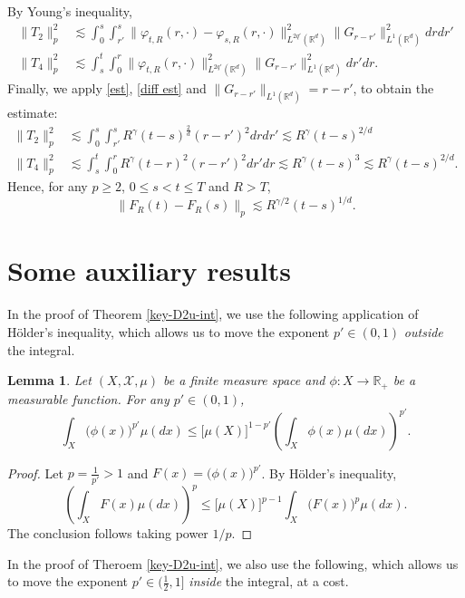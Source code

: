 \documentclass[12pt]{article}
\newtheorem{lemma}[theorem]{Lemma}
\def\bR{\mathbb{R}}
\newcommand{\les}{\lesssim}
\begin{document}
By Young's inequality, 
\begin{align*}
\|T_2\|^2_p & \les \int_0^s \int_{r'}^s  \| \varphi_{t,R}(r,\cdot) - \varphi_{s,R}(r,\cdot) \|_{L^{2q'}(\bR^d)}^2 \|G_{r-r'}\|_{L^1(\bR^d)}^2 drdr' \\
\|T_4\|^2_p & \les \int_s^t \int_0^r  \| \varphi_{t,R}(r,\cdot)\|_{L^{2q'}(\bR^d)}^2 \|G_{r-r'}\|_{L^1(\bR^d)}^2 dr'dr.
\end{align*}
Finally, we apply \eqref{est}, \eqref{diff est} and $\|G_{r-r'}\|_{L^1(\bR^d)} = r-r'$, to obtain the estimate:
\begin{align*}
\|T_2\|^2_p & \les \int_0^s \int_{r'}^s  R^{\gamma} (t-s)^{\frac{2}{d}} (r-r')^2 drdr' \les R^{\gamma}(t-s)^{2/d} \\
\|T_4\|^2_p & \les \int_s^t \int_0^r R^{\gamma} (t-r)^{2} (r-r')^2 dr'dr \les R^{\gamma}(t-s)^{3} \les R^{\gamma}(t-s)^{2/d}.
\end{align*}
Hence, for any $p\geq 2$, $0\leq s<t\leq T$ and $R>T$,
\[
\|F_R(t)-F_R(s)\|_p \les R^{\gamma/2} (t-s)^{1/d}.
\]


\appendix
\section{Some auxiliary results}

In the proof of Theorem \ref{key-D2u-int}, we use the following application of H\"older's inequality, which allows us to move the exponent $p' \in (0,1)$ {\em outside} the integral.


\begin{lemma}
\label{Hol-lem}
Let $(X,\mathcal{X},\mu)$ be a finite measure space and $\phi:X \to \bR_{+}$ be a measurable function. For any $p' \in (0,1)$,
\[
\int_{X} \big(\phi(x)\big)^{p'} \mu(dx) \leq \big[\mu(X)\big]^{1-p'} \left( \int_{X} \phi(x) \mu(dx)\right)^{p'}.
\]
\end{lemma}

\begin{proof}
Let $p=\frac{1}{p'}>1$ and $F(x)=\big(\phi(x)\big)^{p'}$. By H\"older's inequality,
\[
\left(\int_{X} F(x) \mu(dx)\right)^p \leq \big[\mu(X)\big]^{p-1}  \int_{X} \big(F(x) \big)^p \mu(dx).
\]
The conclusion follows taking power $1/p$.
\end{proof}

In the proof of Theroem \ref{key-D2u-int}, we also use the following, which allows us to move the exponent $p' \in (\frac12,1]$ {\em inside} the integral, at a cost. 
\end{document}
